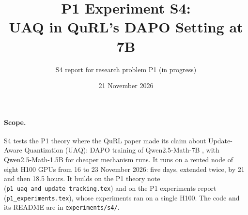 \documentclass[11pt]{article}
\title{P1 Experiment S4:\\UAQ in QuRL's DAPO Setting at 7B}
\author{S4 report for research problem P1 (in progress)}
\date{21 November 2026}
\begin{document}
\maketitle

\paragraph{Scope.} S4 tests the P1 theory where the QuRL paper made its claim about Update-Aware Quantization (UAQ): DAPO training of Qwen2.5-Math-7B \citep[Sec.~5.1 and Table~4]{li2026qurl}, with Qwen2.5-Math-1.5B for cheaper mechanism runs. It runs on a rented node of eight H100 GPUs from 16 to 23 November 2026: five days, extended twice, by 21 and then 18.5 hours. It builds on the P1 theory note (\texttt{p1\_uaq\_and\_update\_tracking.tex}) and on the P1 experiments report (\texttt{p1\_experiments.tex}), whose experiments ran on a single H100. The code and its README are in \texttt{experiments/s4/}.
\end{document}
